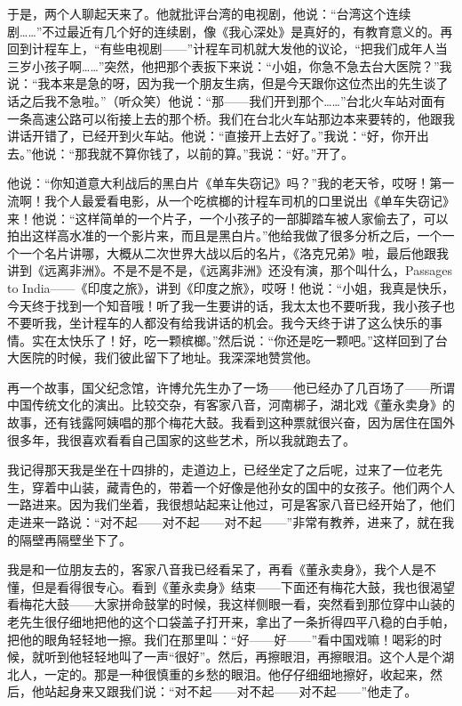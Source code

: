 \par 于是，两个人聊起天来了。他就批评台湾的电视剧，他说：“台湾这个连续剧……”不过最近有几个好的连续剧，像《我心深处》是真好的，有教育意义的。再回到计程车上，“有些电视剧——”计程车司机就大发他的议论，“把我们成年人当三岁小孩子啊……”突然，他把那个表扳下来说：“小姐，你急不急去台大医院？”我说：“我本来是急的呀，因为我一个朋友生病，但是今天跟你这位杰出的先生谈了话之后我不急啦。”（听众笑）他说：“那——我们开到那个……”台北火车站对面有一条高速公路可以衔接上去的那个桥。我们在台北火车站那边本来要转的，他跟我讲话开错了，已经开到火车站。他说：“直接开上去好了。”我说：“好，你开出去。”他说：“那我就不算你钱了，以前的算。”我说：“好。”开了。
\par 他说：“你知道意大利战后的黑白片《单车失窃记》吗？”我的老天爷，哎呀！第一流啊！我个人最爱看电影，从一个吃槟榔的计程车司机的口里说出《单车失窃记》来！他说：“这样简单的一个片子，一个小孩子的一部脚踏车被人家偷去了，可以拍出这样高水准的一个影片来，而且是黑白片。”他给我做了很多分析之后，一个一个一个名片讲哪，大概从二次世界大战以后的名片，《洛克兄弟》啦，最后他跟我讲到《远离非洲》。不是不是不是，《远离非洲》还没有演，那个叫什么，Passages to India——《印度之旅》，讲到《印度之旅》，哎呀！他说：“小姐，我真是快乐，今天终于找到一个知音哦！听了我一生要讲的话，我太太也不要听我，我小孩子也不要听我，坐计程车的人都没有给我讲话的机会。我今天终于讲了这么快乐的事情。实在太快乐了！好，吃一颗槟榔。”然后说：“你还是吃一颗吧。”这样回到了台大医院的时候，我们彼此留下了地址。我深深地赞赏他。
\par 再一个故事，国父纪念馆，许博允先生办了一场——他已经办了几百场了——所谓中国传统文化的演出。比较交杂，有客家八音，河南梆子，湖北戏《董永卖身》的故事，还有钱露阿姨唱的那个梅花大鼓。我看到这种票就很兴奋，因为居住在国外很多年，我很喜欢看看自己国家的这些艺术，所以我就跑去了。
\par 我记得那天我是坐在十四排的，走道边上，已经坐定了之后呢，过来了一位老先生，穿着中山装，藏青色的，带着一个好像是他孙女的国中的女孩子。他们两个人一路进来。因为我们坐着，我很想站起来让他过，可是客家八音已经开始了，他们走进来一路说：“对不起——对不起——对不起——”非常有教养，进来了，就在我的隔壁再隔壁坐下了。
\par 我是和一位朋友去的，客家八音我已经看呆了，再看《董永卖身》，我个人是不懂，但是看得很专心。看到《董永卖身》结束——下面还有梅花大鼓，我也很渴望看梅花大鼓——大家拼命鼓掌的时候，我这样侧眼一看，突然看到那位穿中山装的老先生很仔细地把他的这个口袋盖子打开来，拿出了一条折得四平八稳的白手帕，把他的眼角轻轻地一擦。我们在那里叫：“好——好——”看中国戏嘛！喝彩的时候，就听到他轻轻地叫了一声“很好”。然后，再擦眼泪，再擦眼泪。这个人是个湖北人，一定的。那是一种很慎重的乡愁的眼泪。他仔仔细细地擦好，收起来，然后，他站起身来又跟我们说：“对不起——对不起——对不起——”他走了。
